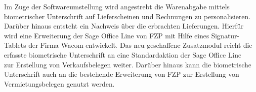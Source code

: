Im Zuge der Softwareumstellung wird angestrebt die Warenabgabe mittels biometrischer Unterschrift auf Lieferscheinen und Rechnungen zu personalisieren. Darüber hinaus entsteht ein Nachweis über die erbrachten Lieferungen. Hierfür wird eine Erweiterung der Sage Office Line von FZP mit Hilfe eines Signatur-Tablets der Firma Wacom entwickelt. Das neu geschaffene Zusatzmodul reicht die erfasste biometrische Unterschrift an eine Standardaktion der Sage Office Line zur Erstellung von Verkaufsbelegen weiter. Darüber hinaus kann die biometrische Unterschrift auch an die bestehende Erweiterung von FZP zur Erstellung von Vermietungsbelegen genutzt werden. \cite{einleitung1}
